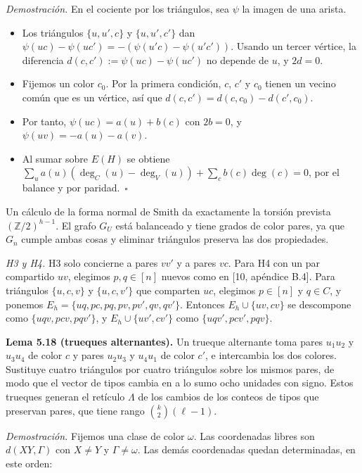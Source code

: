 \documentclass[spanish,11pt,a4paper]{article}
\providecommand{\tightlist}{\setlength{\itemsep}{0pt}\setlength{\parskip}{0pt}}
\begin{document}
\emph{Demostración.} En el cociente por los triángulos, sea \(\psi\) la imagen de una arista.

\begin{itemize}
\tightlist
\item
  Los triángulos \(\{u,u',c\}\) y \(\{u,u',c'\}\) dan \(\psi(uc)-\psi(uc')=-(\psi(u'c)-\psi(u'c'))\). Usando un tercer vértice, la diferencia \(d(c,c'):=\psi(uc)-\psi(uc')\) no depende de \(u\), y \(2d=0\).
\item
  Fijemos un color \(c_0\). Por la primera condición, \(c\), \(c'\) y \(c_0\) tienen un vecino común que es un vértice, así que \(d(c,c')=d(c,c_0)-d(c',c_0)\).
\item
  Por tanto, \(\psi(uc)=a(u)+b(c)\) con \(2b=0\), y \(\psi(uv)=-a(u)-a(v)\).
\item
  Al sumar sobre \(E(H)\) se obtiene \(\sum_ua(u)(\deg_C(u)-\deg_V(u))+\sum_cb(c)\deg(c)=0\), por el balance y por paridad.~\(\square\)
\end{itemize}

Un cálculo de la forma normal de Smith da exactamente la torsión prevista \((\mathbb Z/2)^{h-1}\). El grafo \(G_U\) está balanceado y tiene grados de color pares, ya que \(G_n\) cumple ambas cosas y eliminar triángulos preserva las dos propiedades.

\emph{H3 y H4.} H3 solo concierne a pares \(vv'\) y a pares \(vc\). Para H4 con un par compartido \(uv\), elegimos \(p,q\in[n]\) nuevos como en {[}10, apéndice B.4{]}. Para triángulos \(\{u,c,v\}\) y \(\{u,c,v'\}\) que comparten \(uc\), elegimos \(p\in[n]\) y \(q\in C\), y ponemos \(E_h=\{uq,pc,pq,pv,pv',qv,qv'\}\). Entonces \(E_h\cup\{uv,cv\}\) se descompone como \(\{uqv,pcv,pqv'\}\), y \(E_h\cup\{uv',cv'\}\) como \(\{uqv',pcv',pqv\}\).

\textbf{Lema 5.18 (trueques alternantes).} Un trueque alternante toma pares \(u_1u_2\) y \(u_3u_4\) de color \(c\) y pares \(u_2u_3\) y \(u_4u_1\) de color \(c'\), e intercambia los dos colores. Sustituye cuatro triángulos por cuatro triángulos sobre los mismos pares, de modo que el vector de tipos cambia en a lo sumo ocho unidades con signo. Estos trueques generan el retículo \(\Lambda\) de los cambios de los conteos de tipos que preservan pares, que tiene rango \(\binom{k}{2}(\ell-1)\).

\emph{Demostración.} Fijemos una clase de color \(\omega\). Las coordenadas libres son \(d(XY,\Gamma)\) con \(X\ne Y\) y \(\Gamma\ne\omega\). Las demás coordenadas quedan determinadas, en este orden:
\end{document}

